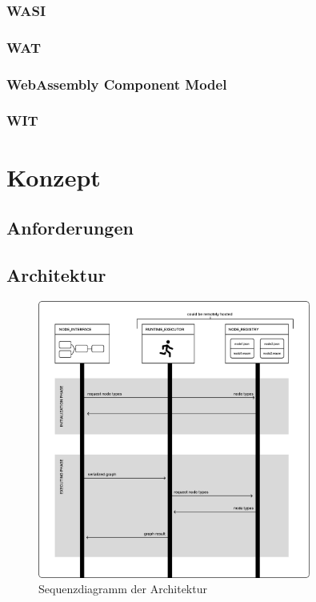 \documentclass[ngerman]{article}
\begin{document}
\subsubsection{WASI}
\subsubsection{WAT}
\subsubsection{WebAssembly Component Model}
\subsubsection{WIT}

\section{Konzept}
\subsection{Anforderungen}
\subsection{Architektur}

\begin{figure}[htbp]
    \centering
    \includegraphics[width=0.8\textwidth]{graphics/OVERVIEW_SEQUENCE.pdf}
    \caption{Sequenzdiagramm der Architektur}
    \label{fig:your_label}
\end{figure}
\end{document}
